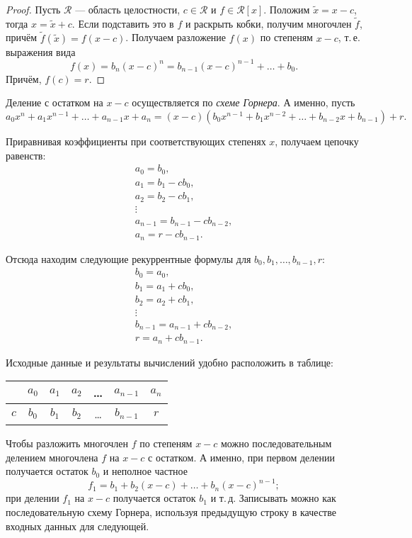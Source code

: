 \begin{proof}
    Пусть $\mathcal{R}$ --- область целостности, $c \in \mathcal{R}$ и $f \in \mathcal{R}[x]$. Положим $\widetilde{x} = x - c$, тогда $x = \widetilde{x} + c$. Если подставить это в $f$ и раскрыть кобки, получим многочлен $\widetilde{f}$, причём $\widetilde{f}(\widetilde{x}) = f(x - c)$. Получаем разложение $f(x)$ по степеням $x - c$, т.\,е. выражения вида
    $$
    f(x) = b_n(x - c)^n = b_{n - 1}(x - c)^{n - 1} + \ldots + b_0.
    $$
    Причём, $f(c) = r$.
\end{proof}

Деление с остатком на $x - c$ осуществляется по \textit{схеме Горнера}. А именно, пусть
$$
a_0x^n + a_1x^{n - 1} + \ldots + a_{n - 1}x + a_n = (x - c)(b_0x^{n - 1} + b_1x^{n - 2} + \ldots + b_{n - 2}x + b_{n - 1}) + r.
$$

Приравнивая коэффициенты при соответствующих степенях $x$, получаем цепочку равенств:
$$
\begin{array}{l}
    a_0 = b_0,\\
    a_1 = b_1 - cb_0,\\
    a_2 = b_2 - cb_1,\\
    \vdots\\
    a_{n - 1} = b_{n - 1} - cb_{n - 2},\\
    a_n = r - cb_{n - 1}.
\end{array}
$$

Отсюда находим следующие рекуррентные формулы для $b_0, b_1, \ldots, b_{n - 1}, r$:
$$
\begin{array}{l}
    b_0 = a_0,\\
    b_1 = a_1 + cb_0,\\
    b_2 = a_2 + cb_1,\\
    \vdots\\
    b_{n - 1} = a_{n - 1} + cb_{n - 2},\\
    r = a_n + cb_{n - 1}.
\end{array}
$$

Исходные данные и результаты вычислений удобно расположить в таблице:

\begin{center}
\begin{tabular}{c|cccccc}
    {} & $a_0$ & $a_1$ & $a_2$ & \ldots & $a_{n - 1}$ & $a_n$\\
    \hline\vspace{1mm}
    $c$ & $b_0$ & $b_1$ & $b_2$ & \ldots & $b_{n - 1}$ & $r$
\end{tabular}
\end{center}

Чтобы разложить многочлен $f$ по степеням $x - c$ можно последовательным делением многочлена $f$ на $x - c$ с остатком. А именно, при первом делении получается остаток $b_0$ и неполное частное
$$
f_1 = b_1 + b_2(x - c) + \ldots + b_n(x - c)^{n - 1};
$$
при делении $f_1$ на $x - c$ получается остаток $b_1$ и т.\,д. Записывать можно как последовательную схему Горнера, используя предыдущую строку в качестве входных данных для следующей.


